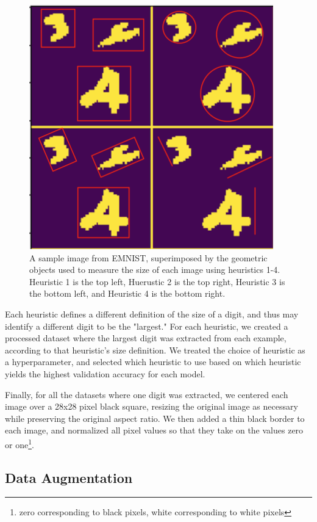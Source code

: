 \documentclass[letterpaper, 10 pt, conference]{ieeeconf}  %
\begin{document}
\begin{figure}[H]
      \centering
      \includegraphics[scale = 1]{size_definitions}
		\centering
      \caption{A sample image from EMNIST, superimposed by the geometric objects used to measure the size of each image using heuristics 1-4. Heuristic 1 is the top left, Huerustic 2 is the top right, Heuristic 3 is the bottom left, and Heuristic 4 is the bottom right.}
      \label{figurelabel}
   \end{figure}

Each heuristic defines a different definition of the size of a digit, and thus may identify a different digit to be the "largest." For each heuristic, we created a processed dataset where the largest digit was extracted from each example, according to that heuristic's size definition. We treated the choice of heuristic as a hyperparameter, and selected which heuristic to use based on which heuristic yields the highest validation accuracy for each model.

Finally, for all the datasets where one digit was extracted, we centered each image over a 28x28 pixel black square, resizing the original image as necessary while preserving the original aspect ratio. We then added a thin black border to each image, and normalized all pixel values so that they take on the values zero or one\footnote{zero corresponding to black pixels, white corresponding to white pixels}. 

\subsection{Data Augmentation} 
\end{document}
